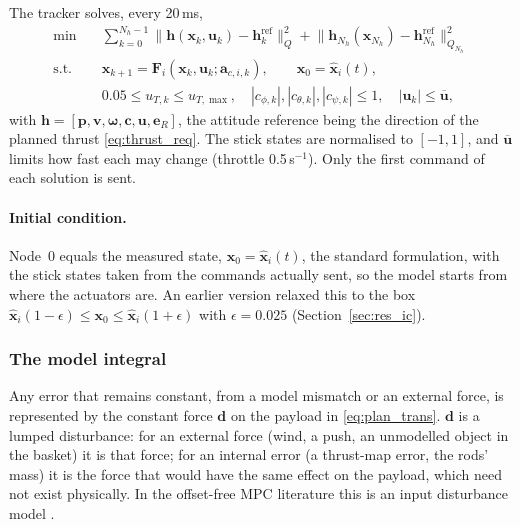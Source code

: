 The tracker solves, every 20\,ms,
\begin{equation}
\begin{aligned}
    \min \quad & \sum_{k=0}^{N_h-1} \big\| \mathbf{h}(\mathbf{x}_k, \mathbf{u}_k) - \mathbf{h}_k^{\mathrm{ref}} \big\|_{Q}^{2} + \big\| \mathbf{h}_{N_h}(\mathbf{x}_{N_h}) - \mathbf{h}_{N_h}^{\mathrm{ref}} \big\|_{Q_{N_h}}^{2} \\
    \text{s.t.} \quad & \mathbf{x}_{k+1} = \mathbf{F}_i(\mathbf{x}_k, \mathbf{u}_k; \mathbf{a}_{c,i,k}), \qquad \mathbf{x}_0 = \hat{\mathbf{x}}_i(t), \\
    & 0.05 \le u_{T,k} \le u_{T,\max}, \quad |c_{\phi,k}|, |c_{\theta,k}|, |c_{\psi,k}| \le 1, \quad |\mathbf{u}_k| \le \overline{\mathbf{u}},
\end{aligned}
\label{eq:trk_ocp}
\end{equation}
with $\mathbf{h} = [\mathbf{p}, \mathbf{v}, \boldsymbol{\omega}, \mathbf{c}, \mathbf{u}, \mathbf{e}_R]$, the
attitude reference being the direction of the planned thrust \eqref{eq:thrust_req}. The stick states
are normalised to $[-1, 1]$, and $\overline{\mathbf{u}}$ limits how fast each may change (throttle
0.5\,s$^{-1}$). Only the first command of each solution is sent.

\paragraph{Initial condition.} Node~0 equals the measured state, $\mathbf{x}_0 = \hat{\mathbf{x}}_i(t)$,
the standard formulation, with the stick states taken from the commands actually sent, so the model
starts from where the actuators are. An earlier version relaxed this to the box
$\hat{\mathbf{x}}_i(1-\epsilon) \le \mathbf{x}_0 \le \hat{\mathbf{x}}_i(1+\epsilon)$ with $\epsilon = 0.025$
(Section~\ref{sec:res_ic}).

\subsubsection{The model integral}
\label{sec:disturbance}

Any error that remains constant, from a model mismatch or an external force, is represented by the
constant force $\mathbf{d}$ on the payload in \eqref{eq:plan_trans}. $\mathbf{d}$ is a lumped disturbance:
for an external force (wind, a push, an unmodelled object in the basket) it is that force; for an
internal error (a thrust-map error, the rods' mass) it is the force that would have the same effect on
the payload, which need not exist physically. In the offset-free MPC literature this is an input
disturbance model \cite{pannocchia2003disturbance, maeder2009linear}.

